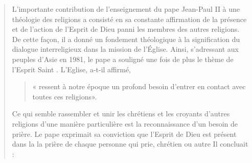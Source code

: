 \begin{quote}
    L'importante contribution de l'enseignement du pape Jean-Paul
II à une théologie des religions a consisté en sa constante
affirmation de la présence et de l'action de l'Esprit de Dieu
panni les membres des autres religions. De cette façon, il a
donné un fondement théologique à la signification du dialogue
interreligieux dans la mission de l'Église. Ainsi, s'adressant
aux peuples d'Asie en 1981, le pape a souligné une fois de
plus le thème de l'Esprit Saint . L'Eglise, a-t-il affirmé, 
\begin{quote}
    « ressent
à notre époque un profond besoin d'entrer en contact avec
toutes ces religions».
\end{quote}
 Ce qui semble rassembler et unir les
chrétiens et les croyants d'autres religions d'une manière particulière
est la reconnaissance d'un besoin de prière. Le pape
exprimait sa conviction que l'Esprit de Dieu est présent dans la
la prière de chaque personne qui prie, chrétien ou autre 
Il concluait :


\end{quote}
